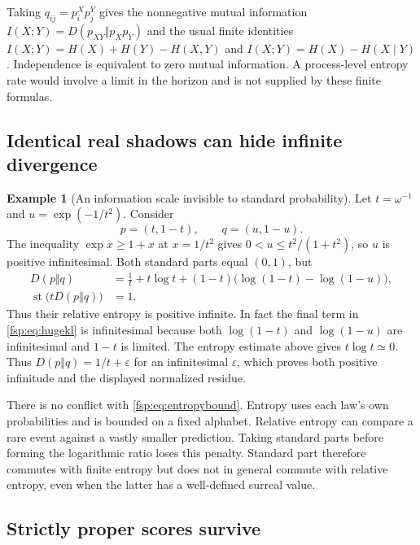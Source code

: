 \documentclass[11pt,a4paper]{article}
\numberwithin{equation}{section}
\theoremstyle{definition}
\newtheorem{example}[theorem]{Example}
\theoremstyle{remark}
\newcommand{\st}{\operatorname{st}}
\newcommand{\eps}{\varepsilon}
\begin{document}
Taking $q_{ij}=p^X_ip^Y_j$ gives the nonnegative mutual information
$I(X;Y)=D(p_{XY}\Vert p_Xp_Y)$ and the usual finite identities
$I(X;Y)=H(X)+H(Y)-H(X,Y)$ and
$I(X;Y)=H(X)-H(X\mid Y)$. Independence is equivalent to zero mutual
information. A process-level entropy rate would involve a limit in the
horizon and is not supplied by these finite formulas.

\subsection{Identical real shadows can hide infinite divergence}

\begin{example}[An information scale invisible to standard probability]
\label{fsp:ex:kl}
Let $t=\omega^{-1}$ and $u=\exp(-1/t^2)$. Consider
\begin{equation}
 p=(t,1-t),\qquad q=(u,1-u).
\end{equation}
The inequality $\exp x\ge1+x$ at $x=1/t^2$ gives
$0<u\le t^2/(1+t^2)$, so $u$ is positive infinitesimal.
Both standard parts equal $(0,1)$, but
\begin{align}
 D(p\Vert q)
 &=\frac1t+t\log t
   +(1-t)\bigl(\log(1-t)-\log(1-u)\bigr),\label{fsp:eq:hugekl}\\
 \st\bigl(tD(p\Vert q)\bigr)&=1.
\end{align}
Thus their relative entropy is positive infinite. In fact the final
term in \eqref{fsp:eq:hugekl} is infinitesimal because both
$\log(1-t)$ and $\log(1-u)$ are infinitesimal and $1-t$ is limited.
The entropy estimate above gives $t\log t\simeq0$.
Thus $D(p\Vert q)=1/t+\eps$ for an infinitesimal $\eps$, which
proves both positive infinitude and the displayed normalized residue.
\end{example}

There is no conflict with \eqref{fsp:eq:entropybound}. Entropy uses each
law's own probabilities and is bounded on a fixed alphabet. Relative
entropy can compare a rare event against a vastly smaller prediction.
Taking standard parts before forming the logarithmic ratio loses this
penalty. Standard part therefore commutes with finite entropy but does
not in general commute with relative entropy, even when the latter
has a well-defined surreal value.

\subsection{Strictly proper scores survive}
\end{document}
